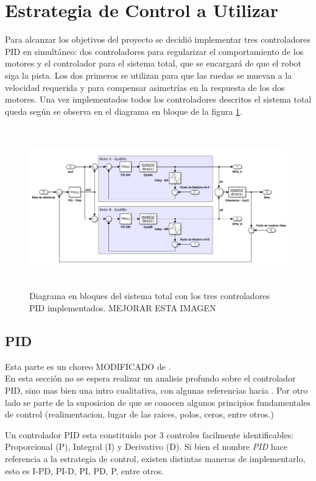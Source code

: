 \documentclass[10pt,conference,a4paper,onecolumn]{article}%
\begin{document}
\section{Estrategia de Control a Utilizar}
\label{sec:estrategia_de_control}
Para alcanzar los objetivos del proyecto se decidió implementar tres controladores PID en simultáneo: dos controladores para regularizar el comportamiento de los motores y el controlador para el sistema total, que se encargará de que el robot siga la pista. Los dos primeros se utilizan para que las ruedas se muevan a la velocidad requerida y para compensar asimetrías en la respuesta de los dos motores.
Una vez implementados todos los controladores descritos el sistema total queda según se observa en el diagrama en bloque de la figura \ref{diagra en bloques sist total}.
\begin{figure}[h]
\centering
\includegraphics[height=7cm]{./imagenes/sistema_total}
\caption{Diagrama en bloques del sistema total con los tres controladores PID implementados. MEJORAR ESTA IMAGEN}
\label{diagra en bloques sist total}
\end{figure}
\subsection{PID}
 Esta parte es un choreo MODIFICADO de \cite[pág. 25]{biblia_PID}.\\

En esta sección no se espera realizar un analisis profundo sobre el controlador PID, sino mas bien una intro cualitativa, con algunas referencias hacia \cite{biblia_PID}. Por otro lado se parte de la suposicion de que se conocen algunos principios fundamentales de control (realimentacion, lugar de las raices, polos, ceros, entre otros.)

Un controlador PID esta constituido por 3 controles facilmente identificables: Proporcional (P), Integral (I) y Derivativo (D). Si bien el nombre \textit{PID} hace referencia a la estrategia de control, existen distintas maneras de implementarlo, esto es I-PD, PI-D, PI, PD, P, entre otros. 
\end{document}
